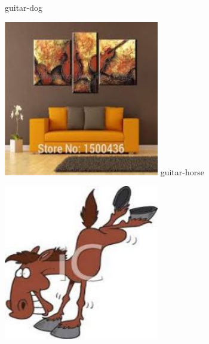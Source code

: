 \documentclass{article}
\begin{document}
\begin{center}
\begin{minipage}{0.142\textwidth}
        guitar-dog
    \end{minipage}%
    \begin{minipage}{0.142\textwidth}
        \includegraphics[width=\linewidth]{./pic/misclassified_r3_p4_2723.jpg}
        guitar-horse
    \end{minipage}%
    \begin{minipage}{0.142\textwidth}
        \includegraphics[width=\linewidth]{./pic/misclassified_r4_p3_2723.jpg}

\end{minipage}
\end{center}
\end{document}
